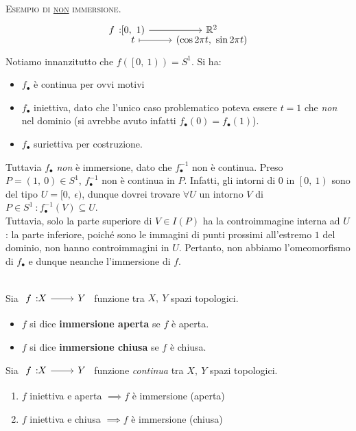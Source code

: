 \begin{example} \textsc{Esempio di \underline{non} immersione.}
	\begin{equation}
		\funztot{f}{\left[0,\ 1\right)}{\realset^2}{t}{\left(\cos 2\pi t,\ \sin 2\pi t\right)}
	\end{equation}
Notiamo innanzitutto che $f\left(\left[0,\ 1\right)\right)=S^{1}$. Si ha:
\begin{itemize}
\item $f_{\bullet}$ è continua per ovvi motivi
\item $f_{\bullet}$ iniettiva, dato che l'unico caso problematico poteva essere $t=1$ che \textit{non} nel dominio (si avrebbe avuto infatti $f_{\bullet}\left(0\right)=f_{\bullet}\left(1\right)$).
\item $f_{\bullet}$ suriettiva per costruzione.
\end{itemize}
Tuttavia $f_{\bullet}$ \textit{non} è immersione, dato che $f_{\bullet}^{-1}$ non è continua. Preso $P=\left(1,\ 0\right)\in S^1$, $f_{\bullet}^{-1}$ non è continua in $P$. Infatti, gli intorni di $0$ in $\left[0,\ 1\right)$ sono del tipo $U=[0,\ \epsilon)$, dunque dovrei trovare $\forall U$ un intorno $V$ di $P\in S^1\ \colon f_{\bullet}^{-1}\left(V\right)\subseteq U$.\\
Tuttavia, solo la parte superiore di $V\in I\left(P\right)$ ha la controimmagine interna ad $U$: la parte inferiore, poiché sono le immagini di punti prossimi all'estremo $1$ del dominio, non hanno controimmagini in $U$. Pertanto, non abbiamo l'omeomorfismo di $f_{\bullet}$ e dunque neanche l'immersione di $f$.
\end{example}
\begin{define}~{}\\
Sia $\funz{f}{X}{Y}$ funzione tra $X,\ Y$ spazi topologici.
\begin{itemize}
\item $f$ si dice \textbf{immersione aperta} se $f$ è aperta.
\item $f$ si dice \textbf{immersione chiusa} se $f$ è chiusa.
\end{itemize}
\vspace{-3mm}
\end{define}
\begin{lemming}
Sia $\funz{f}{X}{Y}$ funzione \textit{continua} tra $X,\ Y$ spazi topologici.
\begin{enumerate}
\item $f$ iniettiva e aperta $\implies f$ è immersione (aperta)
\item $f$ iniettiva e chiusa $\implies f$ è immersione (chiusa)
\end{enumerate}
\vspace{-3mm}
\end{lemming}
